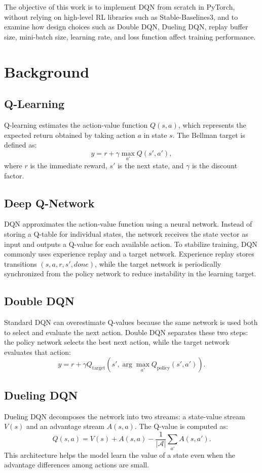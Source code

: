 \documentclass[conference]{IEEEtran}
\begin{document}
The objective of this work is to implement DQN from scratch in PyTorch, without relying on high-level RL libraries such as Stable-Baselines3, and to examine how design choices such as Double DQN, Dueling DQN, replay buffer size, mini-batch size, learning rate, and loss function affect training performance.

\section{Background}
\subsection{Q-Learning}
Q-learning estimates the action-value function $Q(s,a)$, which represents the expected return obtained by taking action $a$ in state $s$. The Bellman target is defined as:
\begin{equation}
y = r + \gamma \max_{a'} Q(s', a'),
\end{equation}
where $r$ is the immediate reward, $s'$ is the next state, and $\gamma$ is the discount factor.

\subsection{Deep Q-Network}
DQN approximates the action-value function using a neural network. Instead of storing a Q-table for individual states, the network receives the state vector as input and outputs a Q-value for each available action. To stabilize training, DQN commonly uses experience replay and a target network. Experience replay stores transitions $(s,a,r,s',done)$, while the target network is periodically synchronized from the policy network to reduce instability in the learning target.

\subsection{Double DQN}
Standard DQN can overestimate Q-values because the same network is used both to select and evaluate the next action. Double DQN separates these two steps: the policy network selects the best next action, while the target network evaluates that action:
\begin{equation}
y = r + \gamma Q_{\text{target}}(s', \arg\max_{a'} Q_{\text{policy}}(s',a')).
\end{equation}

\subsection{Dueling DQN}
Dueling DQN decomposes the network into two streams: a state-value stream $V(s)$ and an advantage stream $A(s,a)$. The Q-value is computed as:
\begin{equation}
Q(s,a) = V(s) + A(s,a) - \frac{1}{|\mathcal{A}|}\sum_{a'} A(s,a').
\end{equation}
This architecture helps the model learn the value of a state even when the advantage differences among actions are small.
\end{document}
